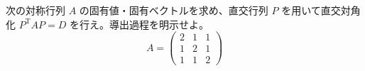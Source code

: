 
次の対称行列 $A$ の固有値・固有ベクトルを求め、直交行列 $P$ を用いて直交対角化 $P^{\mathrm{T}}AP = D$ を行え。導出過程を明示せよ。
\[
A = \begin{pmatrix} 2 & 1 & 1 \\ 1 & 2 & 1 \\ 1 & 1 & 2 \end{pmatrix}
\]
